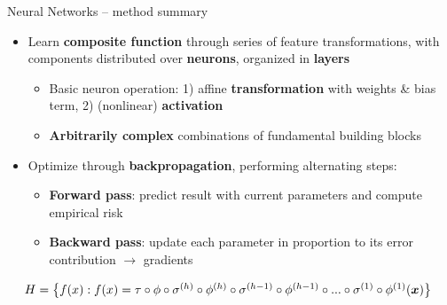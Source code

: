 \setdraft

\begin{frame}{Neural Networks -- method summary}

 
 

\medskip

\begin{itemize}
  \item Learn \textbf{composite function} through series of feature 
  transformations, with components distributed over \textbf{neurons}, organized 
  in \textbf{layers}
  \begin{itemize}
    \item Basic neuron operation: 1) affine \textbf{transformation} with 
    weights \& bias term, 
    2) (nonlinear) \textbf{activation}
    \item \textbf{Arbitrarily complex} combinations of fundamental building 
    blocks
  \end{itemize}
  \item Optimize through \textbf{backpropagation}, performing alternating steps:
  \begin{itemize}
    \item \textbf{Forward pass}: predict result with current parameters and 
    compute empirical risk 
    \item \textbf{Backward pass}: update each parameter in proportion to its 
    error contribution $\rightarrow$ gradients
  \end{itemize}
\end{itemize}

\medskip
 
 ~~
$H = \left\{ f(x): f(x) = \tau \circ \phi \circ \sigma^{(h)} \circ
\phi^{(h)} \circ \sigma^{(h - 1)} \circ \phi^{(h - 1)} \circ ... \circ 
\sigma^{(1)} \circ \phi^{(1)} (\bm{x}) \right\}$

\smallskip


\end{frame}
